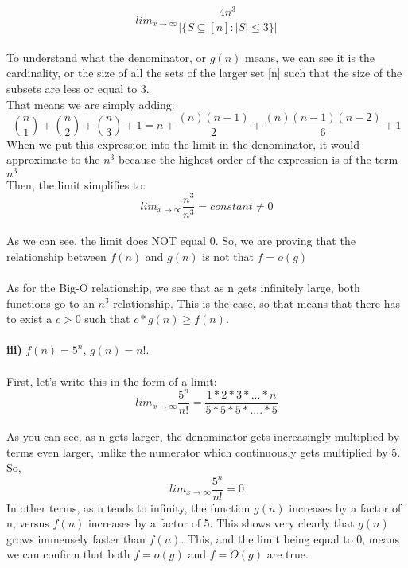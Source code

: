 \documentclass[11pt]{article}
\begin{document}
    \begin{equation*}
        lim_{x\to\infty}\frac{4n^3}{ \left| \{S \subseteq [n] : |S|\leq 3\}\right|}
    \end{equation*} \\
    To understand what the denominator, or $g(n)$ means, we can see it is the cardinality, or the size of all the sets of the larger set [n] such that the size of the subsets are less or equal to 3.
    \\ That means we are simply adding:
    \begin{equation*}
        {n \choose{1}} + {n\choose{2}} + {n \choose{3}} + 1
         = n + \frac{(n)(n-1)}{2} + \frac{(n)(n-1)(n-2)}{6} + 1
    \end{equation*}
    When we put this expression into the limit in the denominator, it would approximate to the $n^3$ because the highest order of the expression is of the term $n^3$
    \\ Then, the limit simplifies to:
    \begin{equation*}
        lim_{x\to\infty}\frac{n^3}{n^3} = constant \neq 0
    \end{equation*}
    \\ As we can see, the limit does NOT equal 0. So, we are proving that the relationship between $f(n)$ and $g(n)$ is not that $f = o(g)$
    \\ \\ As for the Big-O relationship, we see that as n gets infinitely large, both functions go to an $n^3$ relationship. This is the case, so that means that there has to exist a $c > 0$ such that $c * g(n) \geq f(n)$.
    \\\\
    \textbf{iii)} $f(n) = 5^n$, $g(n)=n!$.
    \\\\
    First, let's write this in the form of a limit:
\begin{equation*}
    lim_{x\to\infty}\frac{5^n}{n!} = \frac{1*2*3*...*n}{5*5*5*....*5}
\end{equation*}
\\As you can see, as n gets larger, the denominator gets increasingly multiplied by terms even larger, unlike the numerator which continuously gets multiplied by 5.
\\ So, 
\begin{equation*}
      lim_{x\to\infty}\frac{5^n}{n!} = 0
\end{equation*}
    In other terms, as n tends to infinity, the function $g(n)$ increases by a factor of n, versus $f(n)$ increases by a factor of 5. This shows very clearly that $g(n)$ grows immensely faster than $f(n)$. This, and the limit being equal to 0, means we can confirm that both $f = o(g)$ and $f = O(g)$ are true.
\end{document}
